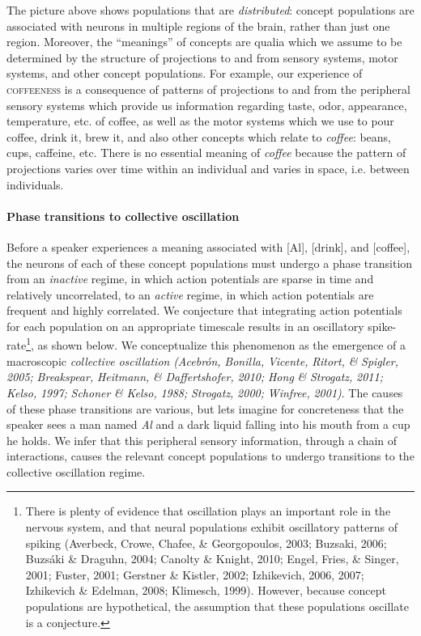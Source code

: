   The picture above shows populations that are \textit{distributed}: concept populations are associated with neurons in multiple regions of the brain, rather than just one region. Moreover, the “meanings” of concepts are qualia which we assume to be determined by the structure of projections to and from sensory systems, motor systems, and other concept populations. For example, our experience of \textsc{coffeeness} is a consequence of patterns of projections to and from the peripheral sensory systems which provide us information regarding taste, odor, appearance, temperature, etc. of coffee, as well as the motor systems which we use to pour coffee, drink it, brew it, and also other concepts which relate to \textit{coffee}: beans, cups, caffeine, etc. There is no essential meaning of \textit{coffee} because the pattern of projections varies over time within an individual and varies in space, i.e. between individuals.

\paragraph{{\textbf{Phase transitions to collective oscillation}}}

Before a speaker experiences a meaning associated with [Al], [drink], and [coffee], the neurons of each of these concept populations must undergo a phase transition from an \textit{inactive} regime, in which action potentials are sparse in time and relatively uncorrelated, to an \textit{active} regime, in which action potentials are frequent and highly correlated. We conjecture that integrating action potentials for each population on an appropriate timescale results in an oscillatory spike-rate\footnote{There is plenty of evidence that oscillation plays an important role in the nervous system, and that neural populations exhibit oscillatory patterns of spiking (Averbeck, Crowe, Chafee, \& Georgopoulos, 2003; Buzsaki, 2006; Buzsáki \& Draguhn, 2004; Canolty \& Knight, 2010; Engel, Fries, \& Singer, 2001; Fuster, 2001; Gerstner \& Kistler, 2002; Izhikevich, 2006, 2007; Izhikevich \& Edelman, 2008; Klimesch, 1999). However, because concept populations are hypothetical, the assumption that these populations oscillate is a conjecture.}, as shown below. We conceptualize this phenomenon as the emergence of a macroscopic \textit{collective} \textit{oscillation} \textit{(Acebrón,} \textit{Bonilla,} \textit{Vicente,} \textit{Ritort,} \textit{\&} \textit{Spigler,} \textit{2005;} \textit{Breakspear,} \textit{Heitmann,} \textit{\&} \textit{Daffertshofer,} \textit{2010;} \textit{Hong} \textit{\&} \textit{Strogatz,} \textit{2011;} \textit{Kelso,} \textit{1997;} \textit{Schoner} \textit{\&} \textit{Kelso,} \textit{1988;} \textit{Strogatz,} \textit{2000;} \textit{Winfree,} \textit{2001)}. The causes of these phase transitions are various, but lets imagine for concreteness that the speaker sees a man named \textit{Al} and a dark liquid falling into his mouth from a cup he holds. We infer that this peripheral sensory information, through a chain of interactions, causes the relevant concept populations to undergo transitions to the collective oscillation regime.

